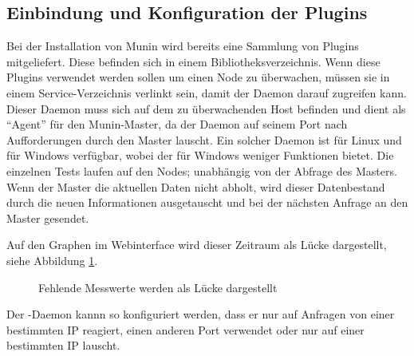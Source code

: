 \newpage

\subsection{Einbindung und Konfiguration der Plugins}
\label{plugins}
Bei der Installation von Munin wird bereits eine Sammlung von Plugins mitgeliefert.
Diese befinden sich in einem Bibliotheksverzeichnis.
Wenn diese Plugins verwendet werden sollen um einen Node zu überwachen, müssen sie in einem Service-Verzeichnis verlinkt sein, damit der Daemon  darauf zugreifen kann.
Dieser Daemon muss sich auf dem zu überwachenden Host befinden und dient als "`Agent"' für den Munin-Master, da der Daemon auf seinem Port nach Aufforderungen durch den Master lauscht.
Ein solcher Daemon ist für Linux und für Windows verfügbar, wobei der für Windows weniger Funktionen bietet.
Die einzelnen Tests laufen auf den Nodes; unabhängig von der Abfrage des Masters.
Wenn der Master die aktuellen Daten nicht abholt, wird dieser Datenbestand durch die neuen Informationen ausgetauscht und bei der nächsten Anfrage an den Master gesendet.

Auf den Graphen im Webinterface wird dieser Zeitraum als Lücke dargestellt, siehe Abbildung \ref{gap}.

\begin{figure}[ht]
	\centering
		\caption{Fehlende Messwerte werden als Lücke dargestellt}
		\label{gap}
\end{figure}

Der -Daemon kannn so konfiguriert werden, dass er nur auf Anfragen von einer bestimmten IP reagiert, einen anderen Port verwendet oder nur auf einer bestimmten IP lauscht.

